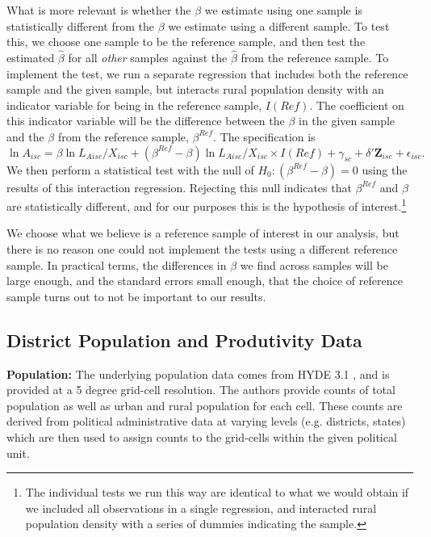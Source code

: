 \documentclass[11pt]{article}
\begin{document}
What is more relevant is whether the $\beta$ we estimate using one sample is statistically different from the $\beta$ we estimate using a different sample. To test this, we choose one sample to be the reference sample, and then test the estimated $\hat{\beta}$ for all \textit{other} samples against the $\hat{\beta}$ from the reference sample. To implement the test, we run a separate regression that includes both the reference sample and the given sample, but interacts rural population density with an indicator variable for being in the reference sample, $I(Ref)$. The coefficient on this indicator variable will be the difference between the $\beta$ in the given sample and the $\beta$ from the reference sample, $\beta^{Ref}$. The specification is
\begin{equation}
    \ln A_{isc} = \beta \ln L_{Aisc}/X_{isc} + (\beta^{Ref} - \beta) \ln L_{Aisc}/X_{isc} \times I(Ref) + \gamma_{sc} + \delta' \mathbf{Z}_{isc} + \epsilon_{isc}. \label{EQ_interaction}
\end{equation}
We then perform a statistical test with the null of $H_0: (\beta^{Ref} - \beta) = 0$ using the results of this interaction regression. Rejecting this null indicates that $\beta^{Ref}$ and $\beta$ are statistically different, and for our purposes this is the hypothesis of interest.\footnote{The individual tests we run this way are identical to what we would obtain if we included all observations in a single regression, and interacted rural population density with a series of dummies indicating the sample.} 

We choose what we believe is a reference sample of interest in our analysis, but there is no reason one could not implement the tests using a different reference sample. In practical terms, the differences in $\beta$ we find across samples will be large enough, and the standard errors small enough, that the choice of reference sample turns out to not be important to our results. 

\subsection{District Population and Produtivity Data}

\noindent\textbf{Population:} The underlying population data comes from HYDE 3.1 \citep{hyde31}, and is provided at a 5 degree grid-cell resolution. The authors provide counts of total population as well as urban and rural population for each cell. These counts are derived from political administrative data at varying levels (e.g. districts, states) which are then used to assign counts to the grid-cells within the given political unit. 
\end{document}
